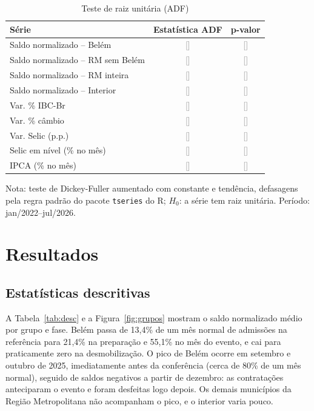 \documentclass[12pt,a4paper]{article}
\newcommand{\afazer}[1]{\textcolor{gray}{[#1]}}
\begin{document}
\begin{table}[H]
\centering\small
\begin{threeparttable}
\caption{Teste de raiz unitária (ADF)}\label{tab:adf}
\begin{tabularx}{\linewidth}{Lcc}
\toprule
Série & Estatística ADF & p-valor\\
\midrule
Saldo normalizado -- Belém & \afazer{} & \afazer{}\\
Saldo normalizado -- RM sem Belém & \afazer{} & \afazer{}\\
Saldo normalizado -- RM inteira & \afazer{} & \afazer{}\\
Saldo normalizado -- Interior & \afazer{} & \afazer{}\\
Var. \% IBC-Br & \afazer{} & \afazer{}\\
Var. \% câmbio & \afazer{} & \afazer{}\\
Var. Selic (p.p.) & \afazer{} & \afazer{}\\
Selic em nível (\% no mês) & \afazer{} & \afazer{}\\
IPCA (\% no mês) & \afazer{} & \afazer{}\\
\bottomrule
\end{tabularx}
\begin{tablenotes}\footnotesize
\item Nota: teste de Dickey-Fuller aumentado com constante e tendência, defasagens pela regra padrão do
pacote \texttt{tseries} do R; $H_0$: a série tem raiz unitária. Período: jan/2022--jul/2026.
\end{tablenotes}
\end{threeparttable}
\end{table}

\section{Resultados}

\subsection{Estatísticas descritivas}

A Tabela~\ref{tab:desc} e a Figura~\ref{fig:grupos} mostram o saldo normalizado médio por grupo e
fase. Belém passa de 13,4\% de um mês normal de admissões na referência para 21,4\% na preparação e
55,1\% no mês do evento, e cai para praticamente zero na desmobilização. O pico de Belém ocorre em
setembro e outubro de 2025, imediatamente antes da conferência (cerca de 80\% de um mês normal),
seguido de saldos negativos a partir de dezembro: as contratações anteciparam o evento e foram
desfeitas logo depois. Os demais municípios da Região Metropolitana não acompanham o pico, e o interior
varia pouco.
\end{document}

